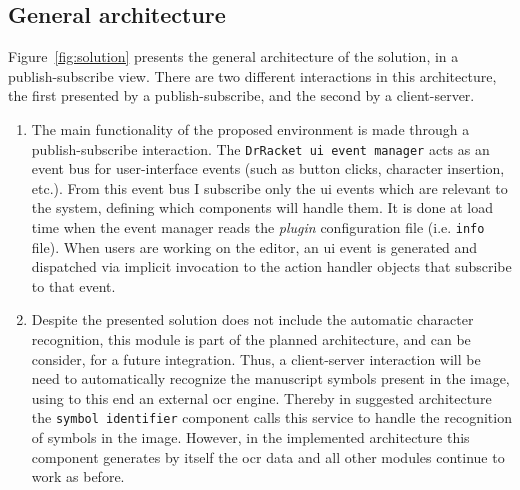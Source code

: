 \subsection{General architecture}

Figure~\ref{fig:solution} presents the general architecture of the solution, in a publish-subscribe view. There are two different interactions in this architecture, the first presented by a publish-subscribe, and the second by a client-server.

\begin{enumerate}
	\item The main functionality of the proposed environment is made through a publish-subscribe interaction. The \texttt{DrRacket \gls{ui} event manager} acts as an event bus for user-interface events (such as button clicks, character insertion, etc.). From this event bus I subscribe only the \gls{ui} events which are relevant to the system, defining which components will handle them. It is done at load time when the event manager reads the \textit{\textit{plugin}} configuration file (i.e. \texttt{info} file). When users are working on the editor, an \gls{ui} event is generated and dispatched via implicit invocation to the action handler objects that subscribe to that event.

	\item Despite the presented solution does not include the automatic character recognition, this module is part of the planned architecture, and can be consider, for a future integration. Thus, a client-server interaction will be need to automatically recognize the manuscript symbols present in the image, using to this end an external \gls{ocr} engine. Thereby in suggested architecture the \texttt{symbol identifier} component calls this service to handle the recognition of symbols in the image. However, in the implemented architecture this component generates by itself the \gls{ocr} data and all other modules continue to work as before.  
\end{enumerate}

